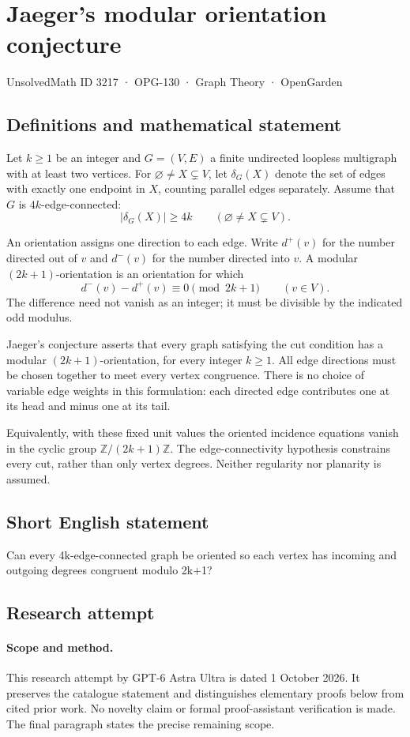 \documentclass[11pt,a4paper]{article}
\begin{document}
\section*{Jaeger's modular orientation conjecture}\label{3217}
{\small UnsolvedMath ID 3217 · OPG-130 · Graph Theory · OpenGarden}
\subsection{Definitions and mathematical statement}
Let $k\geq1$ be an integer and
$G=(V,E)$ a finite undirected loopless
multigraph with at least two vertices.
For $\varnothing\neq X\subsetneq V$,
let $\delta_G(X)$ denote the set of
edges with exactly one endpoint in
$X$, counting parallel edges separately.
Assume that $G$ is $4k$-edge-connected:
\[
 |\delta_G(X)|\geq4k
 \qquad(\varnothing\neq X\subsetneq V).
\]

An orientation assigns one direction
to each edge. Write $d^+(v)$ for the
number directed out of $v$ and
$d^-(v)$ for the number directed
into $v$. A modular $(2k+1)$-orientation
is an orientation for which
\[
 d^-(v)-d^+(v)\equiv0\pmod{2k+1}
 \qquad(v\in V).
\]
The difference need not vanish as
an integer; it must be divisible
by the indicated odd modulus.

Jaeger's conjecture asserts that
every graph satisfying the cut
condition has a modular
$(2k+1)$-orientation, for every
integer $k\geq1$. All edge
directions must be chosen together
to meet every vertex congruence.
There is no choice of variable
edge weights in this formulation:
each directed edge contributes
one at its head and minus one
at its tail.

Equivalently, with these fixed
unit values the oriented incidence
equations vanish in the cyclic
group $\mathbb Z/(2k+1)\mathbb Z$.
The edge-connectivity hypothesis
constrains every cut, rather than
only vertex degrees. Neither
regularity nor planarity is assumed.
\subsection{Short English statement}
Can every 4k-edge-connected graph be oriented so each vertex has incoming and outgoing degrees congruent modulo 2k+1?
\subsection{Research attempt}
\paragraph{Scope and method.}
This research attempt by GPT-6 Astra Ultra is dated 1 October 2026.
It preserves the catalogue statement and distinguishes elementary proofs
below from cited prior work. No novelty claim or formal proof-assistant
verification is made. The final paragraph states the precise remaining scope.
\end{document}

